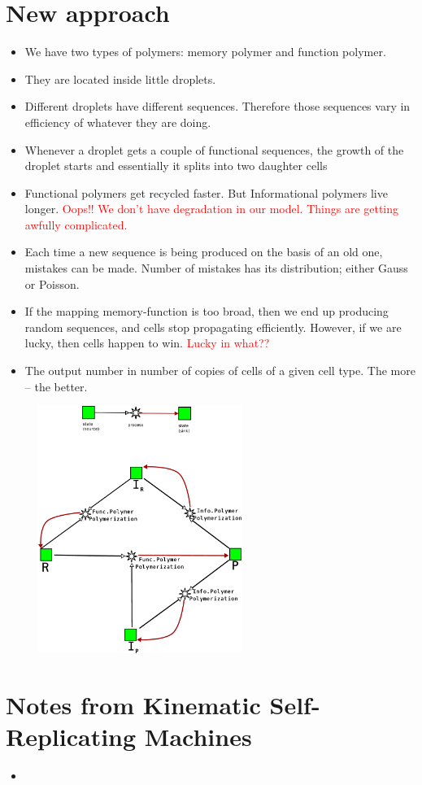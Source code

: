 \documentclass[12pt]{paper}
\newcommand{\red}[1]{\textcolor{red}{#1}}
\begin{document}
\newpage
\section{New approach}
\begin{itemize}
 \item 
We have two types of polymers: memory polymer and function polymer. 
\item They are located inside little 
droplets. 
\item Different droplets have different sequences. Therefore those sequences vary in efficiency of
whatever they are doing.
\item Whenever a droplet gets a couple of functional sequences, the growth of the droplet starts and
essentially it splits into two daughter cells
\item Functional polymers get recycled faster. But Informational polymers live longer.
\red{Oops!! We don't have degradation in our model. Things are getting awfully complicated.}
\item Each time a new sequence is being produced on the basis of an old one, mistakes can be made. 
Number of mistakes has its distribution; either Gauss or Poisson.  
\item If the mapping memory-function is too broad, then we end up producing random sequences, and 
cells stop propagating efficiently. However, if we are lucky, then cells happen to win. \red{Lucky 
in what??}
\item The output number in number of copies of cells of a given cell type. The more -- the better.
\end{itemize}

\begin{figure}[h!]
 \centering
\includegraphics[width=0.59\textwidth]{pictures/info-func-porymers-newview.pdf}
\end{figure}

\section{Notes from Kinematic Self-Replicating Machines \cite{Freitas2004}}
\begin{itemize}
 \item 
\end{itemize}


 
\end{document}
